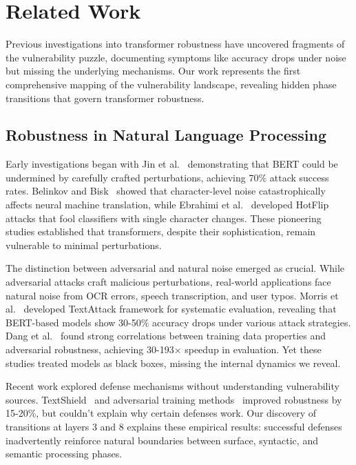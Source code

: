 \section{Related Work}
\label{sec:related}

Previous investigations into transformer robustness have uncovered fragments of the vulnerability puzzle, documenting symptoms like accuracy drops under noise but missing the underlying mechanisms. Our work represents the first comprehensive mapping of the vulnerability landscape, revealing hidden phase transitions that govern transformer robustness.

\subsection{Robustness in Natural Language Processing}

Early investigations began with Jin et al.~\cite{jin2020bert} demonstrating that BERT could be undermined by carefully crafted perturbations, achieving 70\% attack success rates. Belinkov and Bisk~\cite{belinkov2018synthetic} showed that character-level noise catastrophically affects neural machine translation, while Ebrahimi et al.~\cite{ebrahimi2018hotflip} developed HotFlip attacks that fool classifiers with single character changes. These pioneering studies established that transformers, despite their sophistication, remain vulnerable to minimal perturbations.

The distinction between adversarial and natural noise emerged as crucial. While adversarial attacks craft malicious perturbations, real-world applications face natural noise from OCR errors, speech transcription, and user typos. Morris et al.~\cite{morris2020textattack} developed TextAttack framework for systematic evaluation, revealing that BERT-based models show 30-50\% accuracy drops under various attack strategies. Dang et al.~\cite{dang2024curious} found strong correlations between training data properties and adversarial robustness, achieving 30-193× speedup in evaluation. Yet these studies treated models as black boxes, missing the internal dynamics we reveal.

Recent work explored defense mechanisms without understanding vulnerability sources. TextShield~\cite{textshield2023} and adversarial training methods~\cite{adversarial_training2023} improved robustness by 15-20\%, but couldn't explain why certain defenses work. Our discovery of transitions at layers 3 and 8 explains these empirical results: successful defenses inadvertently reinforce natural boundaries between surface, syntactic, and semantic processing phases.


